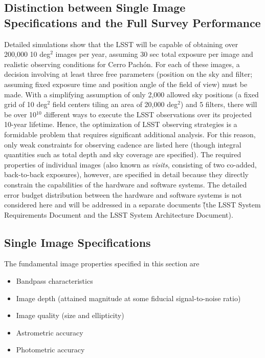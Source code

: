 \subsection{Distinction between Single Image Specifications and the
                        Full Survey Performance}


Detailed simulations show that the LSST will be capable of obtaining over
200,000 10 deg$^2$ images per year, assuming 30 sec total exposure per
image and realistic observing conditions for Cerro Pach\'{o}n. For each of
these images, a decision involving at least three free
parameters (position on the sky and filter; assuming fixed exposure time
and position angle of the field of view) must be made. With a
simplifying assumption of only 2,000 allowed sky positions (\ie a
fixed grid of 10 deg$^2$ field centers tiling an area of 20,000 deg$^2$)
and 5 filters, there will be over 10$^{10}$ different ways to execute the
LSST observations over its projected 10-year lifetime. Hence, the
optimization of LSST observing strategies is a formidable problem that
requires significant additional analysis. For this reason, only weak
constraints for observing cadence are listed here (though integral
quantities such as total depth and sky coverage are specified).
The required properties of individual images (also known as {\it
visits}, consisting of two co-added, back-to-back exposures), however,
are specified
in detail because they directly constrain the capabilities of the hardware
and software systems. The detailed error budget distribution between the hardware
and software systems is not considered here and will be addressed in a
separate documents
\G{(the LSST System Requirements Document and the LSST System Architecture Document)}.




\subsection{              Single Image Specifications              }
\label{singleImageSpecs}


The fundamental image properties specified in this section are
\begin{itemize}
\item Bandpass characteristics
\item Image depth (attained magnitude at some fiducial signal-to-noise ratio)
\item Image quality (size and ellipticity)
\item Astrometric accuracy
\item Photometric accuracy
\end{itemize}

